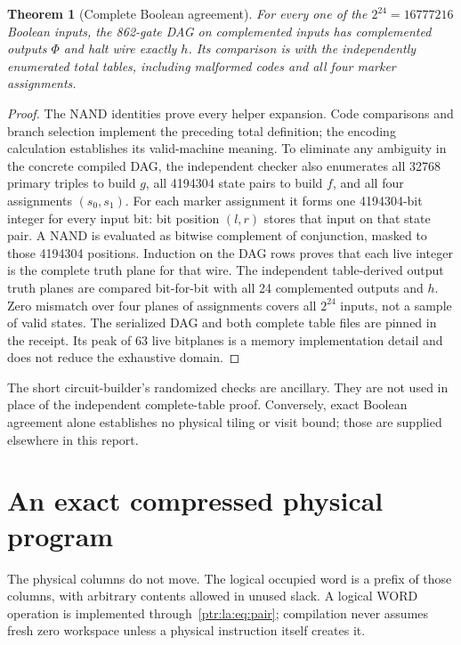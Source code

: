 \documentclass[11pt,letterpaper]{article}
\newtheorem{theorem}{Theorem}[section]
\theoremstyle{definition}\newtheorem{definition}[theorem]{Definition}
\theoremstyle{remark}\newtheorem{remark}[theorem]{Remark}
\begin{document}
\begin{theorem}[Complete Boolean agreement]\label{ptr:la:thm:boolean}
For every one of the $2^{24}=16777216$ Boolean inputs, the 862-gate DAG on complemented inputs has complemented outputs $\Phi$ and halt wire exactly $h$. Its comparison is with the independently enumerated total tables, including malformed codes and all four marker assignments.
\end{theorem}
\begin{proof}
The NAND identities prove every helper expansion. Code comparisons and branch selection implement the preceding total definition; the encoding calculation establishes its valid-machine meaning. To eliminate any ambiguity in the concrete compiled DAG, the independent checker also enumerates all 32768 primary triples to build $g$, all 4194304 state pairs to build $f$, and all four assignments $(s_0,s_1)$. For each marker assignment it forms one 4194304-bit integer for every input bit: bit position $(l,r)$ stores that input on that state pair. A NAND is evaluated as bitwise complement of conjunction, masked to those 4194304 positions. Induction on the DAG rows proves that each live integer is the complete truth plane for that wire. The independent table-derived output truth planes are compared bit-for-bit with all 24 complemented outputs and $h$. Zero mismatch over four planes of assignments covers all $2^{24}$ inputs, not a sample of valid states. The serialized DAG and both complete table files are pinned in the receipt. Its peak of 63 live bitplanes is a memory implementation detail and does not reduce the exhaustive domain.
\end{proof}
The short circuit-builder's randomized checks are ancillary. They are not used in place of the independent complete-table proof. Conversely, exact Boolean agreement alone establishes no physical tiling or visit bound; those are supplied elsewhere in this report.

\section{An exact compressed physical program}\label{ptr:la:sec:program}
The physical columns do not move. The logical occupied word is a prefix of those columns, with arbitrary contents allowed in unused slack. A logical WORD operation is implemented through~\eqref{ptr:la:eq:pair}; compilation never assumes fresh zero workspace unless a physical instruction itself creates it.
\end{document}
